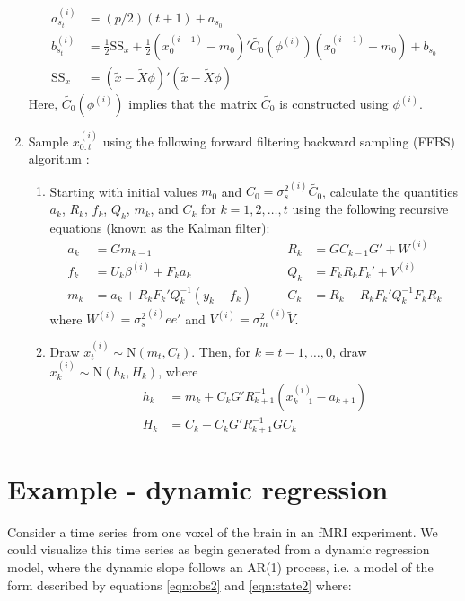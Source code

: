 \documentclass{article}
\begin{document}
\begin{enumerate}
\begin{align*}
a_{s_t}^{(i)} &= (p/2)(t+1) + a_{s_0} \\
b_{s_t}^{(i)} &= \frac{1}{2}\mbox{SS}_x + \frac{1}{2}(x_0^{(i-1)}-m_0)'\tilde{C_0}(\phi^{(i)})(x_0^{(i-1)}-m_0) + b_{s_0} \\
\mbox{SS}_x &= (\tilde{x} - \tilde{X}\phi)'(\tilde{x} - \tilde{X}\phi)
\end{align*}
\noindent Here, $\tilde{C_0}(\phi^{(i)})$ implies that the matrix $\tilde{C_0}$ is constructed using $\phi^{(i)}$.
\item Sample $x_{0:t}^{(i)}$ using the following forward filtering backward sampling (FFBS) algorithm \citep{petris2009dynamic}:
\begin{enumerate}
\item Starting with initial values $m_0$ and $C_0 = {\sigma^2_s}^{(i)}\tilde{C_0}$, calculate the quantities $a_k$, $R_k$, $f_k$, $Q_k$, $m_k$, and $C_k$ for $k = 1,2,\ldots,t$ using the following recursive equations (known as the Kalman filter):
    \begin{align*}
    a_k &= Gm_{k-1} &\qquad R_k &= GC_{k-1}G' + W^{(i)} \\
    f_k &= U_k\beta^{(i)} + F_ka_k &\qquad Q_k &= F_kR_kF_k' + V^{(i)} \\
    m_k &= a_k + R_kF_k'Q_k^{-1}(y_k-f_k) &\qquad C_k &= R_k - R_kF_k'Q_k^{-1}F_kR_k
    \end{align*}
    \noindent where $W^{(i)} = {\sigma^2_s}^{(i)}ee'$ and $V^{(i)} = {\sigma^2_m}^{(i)}\tilde{V}$.
\item Draw $x_t^{(i)} \sim \mbox{N}(m_t,C_t)$. Then, for $k = t-1,\ldots,0$, draw $x_k^{(i)} \sim \mbox{N}(h_k,H_k)$, where
    \begin{align*}
    h_k &= m_k + C_kG'R_{k+1}^{-1}(x_{k+1}^{(i)} - a_{k+1}) \\
    H_k &= C_k - C_kG'R_{k+1}^{-1}GC_k
    \end{align*}
\end{enumerate}
\end{enumerate}

\section{Example - dynamic regression} \label{sec:exdr}

Consider a time series from one voxel of the brain in an fMRI experiment. We could visualize this time series as begin generated from a dynamic regression model, where the dynamic slope follows an AR(1) process, i.e. a model of the form described by equations \eqref{eqn:obs2} and \eqref{eqn:state2} where:
\end{document}

